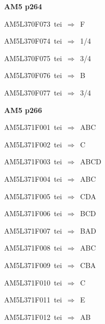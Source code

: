\par\vfill\eject
{\bf\hfill AM5 p264\hfill\hbox{}}\par\bigskip
{\sixrm AM5L370F073\ {\sixit tei}\ }$\Rightarrow$\ F\par\smallskip
{\sixrm AM5L370F074\ {\sixit tei}\ }$\Rightarrow$\ 1/4\par\smallskip
{\sixrm AM5L370F075\ {\sixit tei}\ }$\Rightarrow$\ 3/4\par\smallskip
{\sixrm AM5L370F076\ {\sixit tei}\ }$\Rightarrow$\ B\par\smallskip
{\sixrm AM5L370F077\ {\sixit tei}\ }$\Rightarrow$\ 3/4\par\smallskip

\par\vfill\eject
{\bf\hfill AM5 p266\hfill\hbox{}}\par\bigskip
{\sixrm AM5L371F001\ {\sixit tei}\ }$\Rightarrow$\ ABC\par\smallskip
{\sixrm AM5L371F002\ {\sixit tei}\ }$\Rightarrow$\ C\par\smallskip
{\sixrm AM5L371F003\ {\sixit tei}\ }$\Rightarrow$\ ABCD\par\smallskip
{\sixrm AM5L371F004\ {\sixit tei}\ }$\Rightarrow$\ ABC\par\smallskip
{\sixrm AM5L371F005\ {\sixit tei}\ }$\Rightarrow$\ CDA\par\smallskip
{\sixrm AM5L371F006\ {\sixit tei}\ }$\Rightarrow$\ BCD\par\smallskip
{\sixrm AM5L371F007\ {\sixit tei}\ }$\Rightarrow$\ BAD\par\smallskip
{\sixrm AM5L371F008\ {\sixit tei}\ }$\Rightarrow$\ ABC\par\smallskip
{\sixrm AM5L371F009\ {\sixit tei}\ }$\Rightarrow$\ CBA\par\smallskip
{\sixrm AM5L371F010\ {\sixit tei}\ }$\Rightarrow$\ C\par\smallskip
{\sixrm AM5L371F011\ {\sixit tei}\ }$\Rightarrow$\ E\par\smallskip
{\sixrm AM5L371F012\ {\sixit tei}\ }$\Rightarrow$\ AB\par\smallskip

